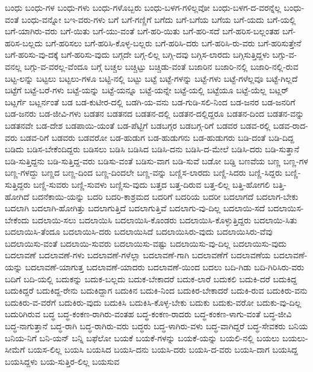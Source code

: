 {ಬಂಧು
ಬಂಧು-ಗಳ
ಬಂಧು-ಗಳು
ಬಂಧು-ಗಳೊಬ್ಬರು
ಬಂಧು-ಬಳಗ-ಗಳಿಲ್ಲವೋ
ಬಂಧು-ಬಳಗ-ದ-ವರನ್ನೆಲ್ಲ
ಬಂಧು-ವಂತೆ
ಬಂಧು-ವನ್ನೋ
ಬಇ-ವರು-ಗಳು
ಬಗೆ
ಬಗೆ-ಗಣ್ಣಿಗೆ
ಬಗೆದು
ಬಗೆ-ಬಗೆಯ
ಬಗೆಯ
ಬಗೆ-ಯದು
ಬಗೆ-ಯಲ್ಲಿ
ಬಗೆ-ಯಾಗಿರು-ವರು
ಬಗೆ-ಯಿತು
ಬಗೆ-ಯು-ವಂತೆ
ಬಗೆ-ಹರಿ-ಯಿತು
ಬಗೆ-ಹರಿ-ಸದೆ
ಬಗೆ-ಹರಿಸ-ಬಲ್ಲಂತಹ
ಬಗೆ-ಹರಿಸ-ಬಲ್ಲದು
ಬಗೆ-ಹರಿಸಲು
ಬಗೆ-ಹರಿಸಿ-ಕೊಳ್ಳ-ಬಲ್ಲರು
ಬಗೆ-ಹರಿಸಿ-ದರು
ಬಗೆ-ಹರಿಸಿ-ರು-ವರು
ಬಗೆ-ಹರಿಸುತ್ತೇನೆ
ಬಗೆ-ಹರಿಸು-ವು-ದಕ್ಕೆ
ಬಗೆ-ಹರಿಸು-ವುದು
ಬಗ್ಗದೇ
ಬಗ್ಗ-ಲಿಲ್ಲ
ಬಗ್ಗಿ-ದವು
ಬಗ್ಗಿಸ-ಲಾರದು
ಬಗ್ಗಿಸುತ್ತಿದ್ದಳು
ಬಗ್ಗು-ವ-ವನಲ್ಲ
ಬಗ್ಗು-ವ-ವರಲ್ಲ-ವೆಂದೂ
ಬಗ್ಗೆ
ಬಚ್ಚಲ
ಬಚ್ಚಿಟ್ಟು
ಬಚ್ಚಿಡು-ವಂತೆ
ಬಜಾರಿನ
ಬಜಾರಿ-ನಲ್ಲಿ
ಬಜಾರಿ-ನಲ್ಲಿ-ರುವ
ಬಟ್ಟ-ಲನ್ನು
ಬಟ್ಟಲು
ಬಟ್ಟಲು-ಗಳೂ
ಬಟ್ಟಿ-ನಲ್ಲಿ
ಬಟ್ಟು
ಬಟ್ಟೆ
ಬಟ್ಟೆ-ಗಳನ್ನು
ಬಟ್ಟೆ-ಗಳು
ಬಟ್ಟೆ-ಗಳೆಲ್ಲವೂ
ಬಟ್ಟೆ-ಗಿಲ್ಲದೆ
ಬಟ್ಟೆಗೆ
ಬಟ್ಟೆ-ಬರೆ-ಗಳು
ಬಟ್ಟೆ-ಯನ್ನು
ಬಟ್ಟೆ-ಯನ್ನೂ
ಬಟ್ಟೆ-ಯನ್ನೇ
ಬಟ್ಟೆ-ಯಲ್ಲಿ
ಬಟ್ಟೆಯೂ
ಬಟ್ಟೆ-ಯೆಲ್ಲ
ಬಟ್ಲರ್
ಬಟ್ಲರ್ಗೆ
ಬಟ್ಲರ್ನಂತೆ
ಬಡ
ಬಡ-ಕುಟೀರ-ದಲ್ಲಿ
ಬಡಗಿ-ಯ-ವನು
ಬಡ-ಗುಡಿ-ಸಲಿ-ನಿಂದ
ಬಡ-ಜನರ
ಬಡ-ಜನರಿಗೆ
ಬಡ-ಜನರು
ಬಡ-ಜೀವಿ-ಗಳು
ಬಡತನ
ಬಡತನದ
ಬಡತನ-ದಲ್ಲಿ
ಬಡತನ-ದಲ್ಲಿದ್ದರೂ
ಬಡತನ-ದಿಂದ
ಬಡತನ-ವನ್ನು
ಬಡತನವೇ
ಬಡ-ದೇಶ
ಬಡಪಾಯಿ-ಯಂತೆ
ಬಡ-ಪೆಟ್ಟಿಗೆ
ಬಡಬಗ್ಗರ
ಬಡಬಗ್ಗ-ರಿಗೆ
ಬಡವರ
ಬಡವ-ರಲ್ಲಿ
ಬಡವ-ರಾದ-ವರು
ಬಡವ-ರಿಗೆ
ಬಡವರು
ಬಡವರೋ
ಬಡ-ಹುಡುಗ
ಬಡ-ಹುಡುಗನು
ಬಡ-ಹುಡುಗರು
ಬಡಿ-ದಂತೆ
ಬಡಿ-ದಿದ್ದ
ಬಡಿದು
ಬಡಿಸ-ಬೇಕೆಂದಿದ್ದರು
ಬಡಿಸಲು
ಬಡಿಸಿ
ಬಡಿಸಿದ
ಬಡಿಸಿ-ದನು
ಬಡಿಸಿ-ದ-ಮೇಲೆ
ಬಡಿಸಿ-ದರು
ಬಡಿ-ಸುತ್ತಾನೆ
ಬಡಿ-ಸುತ್ತಿದ್ದನು
ಬಡಿ-ಸುತ್ತಿದ್ದ-ವರು
ಬಡಿಸು-ವಂತೆ
ಬಡಿಸು-ವಾಗ
ಬಡಿ-ಸುವೆ
ಬಡೋ
ಬಡ್ಡಿ
ಬಣವೆಯ
ಬಣ್ಣ
ಬಣ್ಣ-ಗಳ
ಬಣ್ಣ-ಗಳದ್ದು
ಬಣ್ಣದ
ಬಣ್ಣ-ದಿಂದ
ಬಣ್ಣ-ದಿಂದಲೇ
ಬಣ್ಣ-ವನ್ನು
ಬಣ್ಣಿಸ-ಲಾರದು
ಬಣ್ಣಿ-ಸಿದರು
ಬಣ್ಣಿ-ಸಿದ್ದರು
ಬಣ್ಣಿ-ಸುತ್ತಿದ್ದರು
ಬಣ್ಣಿ-ಸುವರು
ಬಣ್ಣಿ-ಸುವಳು
ಬಣ್ಣಿಸು-ವುದು
ಬತ್ತದ
ಬತ್ತ-ದಿರುವ
ಬತ್ತ-ಲಿಲ್ಲ
ಬತ್ತಿ-ಹೋಗಲಿ
ಬತ್ತಿ-ಹೋಗಿದೆ
ಬದನೆಕಾಯಿ-ಯನ್ನು
ಬದರಿ
ಬದರಿ-ಕಾಶ್ರಮದ
ಬದರಿಗೆ
ಬದರಿಯ
ಬದರೀ
ಬದಲಾಗದೆ
ಬದಲಾಗ-ಬೇಕು
ಬದಲಾಗಿ
ಬದಲಾಗಿ-ಹೋಗಿತ್ತು
ಬದಲಾಗುತ್ತಿದೆ
ಬದಲಾಗುತ್ತಿವೆ
ಬದಲಾಗು-ವು-ದಿಲ್ಲ
ಬದಲಾಯಿ-ಸದೆ
ಬದಲಾಯಿಸ-ಬೇಕೆಂದು
ಬದಲಾಯಿ-ಸಲು
ಬದಲಾಯಿಸಿ
ಬದಲಾಯಿಸಿ-ಕೊಂಡರು
ಬದಲಾಯಿಸಿ-ಕೊಳ್ಳುತ್ತಿದ್ದರು
ಬದಲಾಯಿ-ಸಿತು
ಬದಲಾಯಿಸಿ-ತೆಂದೂ
ಬದಲಾಯಿಸಿ-ದರು
ಬದಲಾಯಿಸಿದೆ
ಬದಲಾಯಿಸಿರು-ವುದು
ಬದಲಾಯಿಸಿರು-ವೆವು
ಬದಲಾಯಿಸು-ವಂತೆ
ಬದಲಾಯಿ-ಸುವರು
ಬದಲಾಯಿಸು-ವಷ್ಟು
ಬದಲಾಯಿಸು-ವು-ದಿಲ್ಲ
ಬದಲಾಯಿಸು-ವುದು
ಬದಲಾವಣೆ
ಬದಲಾವಣೆ-ಗಳು
ಬದಲಾವಣೆ-ಗಳೆಲ್ಲಾ
ಬದಲಾವಣೆ-ಗಾಗಿ
ಬದಲಾವಣೆಗೆ
ಬದಲಾವಣೆಯ
ಬದಲಾವಣೆ-ಯನ್ನು
ಬದಲಾವಣೆ-ಯಾಗುತ್ತ
ಬದಲಾವಣೆ-ಯಾದರು
ಬದಲಾವಣೆ-ಯಿಂದ
ಬದಲು
ಬದಿ-ಗಿಡು
ಬದಿ-ಗಿರಿಸಿರು-ವರು
ಬದಿಗೆ
ಬದಿ-ಯಲ್ಲಿ
ಬದುಕನ್ನು
ಬದುಕ-ಬಲ್ಲದು
ಬದುಕ-ಬೇಕಾದರೆ
ಬದುಕ-ಲಾರೆ
ಬದುಕಲಿ
ಬದುಕಿ-ದರೆ
ಬದುಕಿದ್ದ
ಬದುಕಿದ್ದರೆ
ಬದುಕಿದ್ದ-ರೇನು
ಬದುಕಿದ್ದಾಗ
ಬದುಕಿನ
ಬದುಕಿ-ನಿಂದ
ಬದುಕಿರ-ಬೇಕಾದರೆ
ಬದುಕಿ-ರುವ
ಬದುಕಿರು-ವನು
ಬದುಕಿರು-ವ-ವರೆಗೆ
ಬದುಕಿರು-ವುದು
ಬದುಕಿಸಿ
ಬದುಕಿಸಿ-ಕೊಳ್ಳ-ಬೇಕು
ಬದುಕು
ಬದುಕು-ವರೋ
ಬದುಕು-ವು-ದಿಲ್ಲ
ಬದುರಿಗಿರುವ
ಬದ್ಧ
ಬದ್ಧ-ಕಂಕಣ-ರಾಗಿರು-ವಂತಹ
ಬದ್ಧ-ಕಂಕಣ-ರಾದರು
ಬದ್ಧ-ಕಂಕಣ-ಳಾಗು-ವಂತೆ
ಬದ್ಧ-ಜೀವಿ
ಬದ್ಧ-ನಾಗುತ್ತಾನೆ
ಬದ್ಧ-ರಾಗಿ
ಬದ್ಧ-ರಾಗಿರು-ವರು
ಬದ್ಧರು
ಬದ್ಧ-ಳಾಗಿರು-ವಳು
ಬದ್ಧ-ವಾಗಿದ್ದರೆ
ಬದ್ಧ-ಸೇವಕರು
ಬನಿಯ
ಬನಿಯ-ನಿಗೆ
ಬನಿ-ಯನ್
ಬನ್ನಿ
ಬಫೆಲೋ
ಬಯಕೆ
ಬಯಕೆ-ಗಳನ್ನು
ಬಯಕೆ-ಯನ್ನು
ಬಯಲಿ-ನಲ್ಲಿ
ಬಯಲು
ಬಯಲು-ಸೀಮೆಗೆ
ಬಯಸ-ಲಿಲ್ಲ
ಬಯಸಿ
ಬಯಸಿದ
ಬಯಸಿ-ದನು
ಬಯಸಿ-ದರು
ಬಯಸಿ-ದ-ವರು
ಬಯಸಿ-ದಾಗ
ಬಯಸಿದ್ದ
ಬಯಸಿದ್ದಳು
ಬಯ-ಸುತ್ತಿರ-ಲಿಲ್ಲ
ಬಯಸುವ
}
